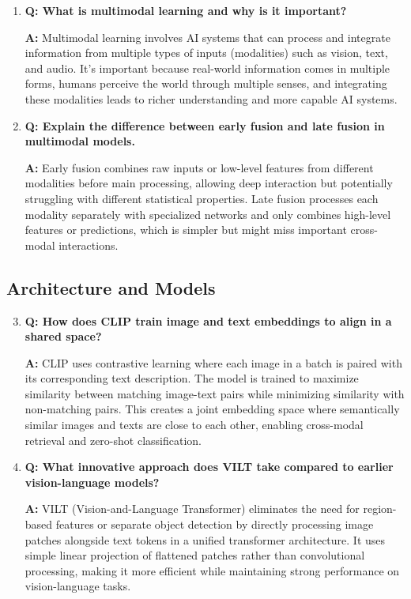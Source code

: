 \begin{enumerate}
    \item \textbf{Q: What is multimodal learning and why is it important?}
    
    \textbf{A:} Multimodal learning involves AI systems that can process and integrate information from multiple types of inputs (modalities) such as vision, text, and audio. It's important because real-world information comes in multiple forms, humans perceive the world through multiple senses, and integrating these modalities leads to richer understanding and more capable AI systems.

    \item \textbf{Q: Explain the difference between early fusion and late fusion in multimodal models.}
    
    \textbf{A:} Early fusion combines raw inputs or low-level features from different modalities before main processing, allowing deep interaction but potentially struggling with different statistical properties. Late fusion processes each modality separately with specialized networks and only combines high-level features or predictions, which is simpler but might miss important cross-modal interactions.
\end{enumerate}

\subsection*{Architecture and Models}

\begin{enumerate}
    \setcounter{enumi}{2}
    \item \textbf{Q: How does CLIP train image and text embeddings to align in a shared space?}
    
    \textbf{A:} CLIP uses contrastive learning where each image in a batch is paired with its corresponding text description. The model is trained to maximize similarity between matching image-text pairs while minimizing similarity with non-matching pairs. This creates a joint embedding space where semantically similar images and texts are close to each other, enabling cross-modal retrieval and zero-shot classification.

    \item \textbf{Q: What innovative approach does VILT take compared to earlier vision-language models?}
    
    \textbf{A:} VILT (Vision-and-Language Transformer) eliminates the need for region-based features or separate object detection by directly processing image patches alongside text tokens in a unified transformer architecture. It uses simple linear projection of flattened patches rather than convolutional processing, making it more efficient while maintaining strong performance on vision-language tasks.
\end{enumerate}
